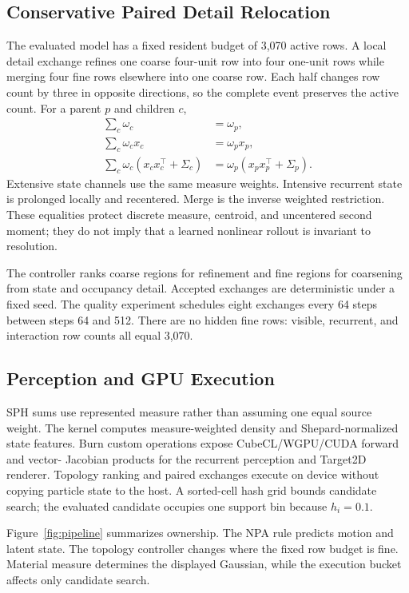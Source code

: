 \documentclass[sigconf,nonacm]{acmart}
\begin{document}
\subsection{Conservative Paired Detail Relocation}

The evaluated model has a fixed resident budget of 3,070 active rows. A local
detail exchange refines one coarse four-unit row into four one-unit rows while
merging four fine rows elsewhere into one coarse row. Each half changes row
count by three in opposite directions, so the complete event preserves the
active count. For a parent $p$ and children $c$,
\begin{align}
  \sum_c \omega_c &= \omega_p,\\
  \sum_c \omega_c x_c &= \omega_p x_p,\\
  \sum_c \omega_c(x_cx_c^\top+\Sigma_c)
    &= \omega_p(x_px_p^\top+\Sigma_p).
  \label{eq:conservation}
\end{align}
Extensive state channels use the same measure weights. Intensive recurrent
state is prolonged locally and recentered. Merge is the inverse weighted
restriction. These equalities protect discrete measure, centroid, and
uncentered second moment; they do not imply that a learned nonlinear rollout
is invariant to resolution.

The controller ranks coarse regions for refinement and fine regions for
coarsening from state and occupancy detail. Accepted exchanges are deterministic
under a fixed seed. The quality experiment schedules eight exchanges every 64
steps between steps 64 and 512. There are no hidden fine rows: visible,
recurrent, and interaction row counts all equal 3,070.

\subsection{Perception and GPU Execution}

SPH sums use represented measure rather than assuming one equal source weight.
The kernel computes measure-weighted density and Shepard-normalized state
features. Burn custom operations expose CubeCL/WGPU/CUDA forward and vector-
Jacobian products for the recurrent perception and Target2D renderer.
Topology ranking and paired exchanges execute on device without copying
particle state to the host. A sorted-cell hash grid bounds candidate search;
the evaluated candidate occupies one support bin because $h_i=0.1$.

Figure~\ref{fig:pipeline} summarizes ownership. The NPA rule predicts motion
and latent state. The topology controller changes where the fixed row budget
is fine. Material measure determines the displayed Gaussian, while the
execution bucket affects only candidate search.
\end{document}

